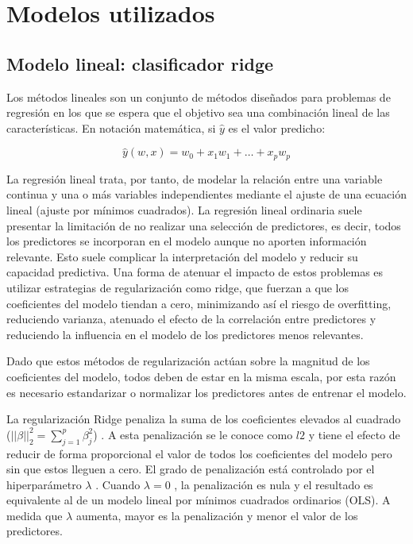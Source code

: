 
\section{Modelos utilizados}
\label{sec:models}

\subsection{Modelo lineal: clasificador ridge}

Los métodos lineales son un conjunto de métodos diseñados para problemas de regresión en los que se espera que el objetivo sea una combinación lineal de las características.
En notación matemática, si $\hat{y}$ es el valor predicho:

\begin{equation}
    \hat{y}(w,x)=w_{0} + x_{1}w_{1} + \dots + x_{p}w_{p}
\end{equation}

La regresión lineal trata, por tanto, de modelar la relación entre una variable continua y una o más variables independientes mediante el ajuste de una ecuación lineal (ajuste por mínimos cuadrados). 
La regresión lineal ordinaria suele presentar la limitación de no realizar una selección de predictores, es decir, todos los predictores se incorporan en el modelo aunque no aporten información relevante. Esto suele complicar la interpretación del modelo y reducir su capacidad predictiva.
Una forma de atenuar el impacto de estos problemas es utilizar estrategias de regularización como ridge, que fuerzan a que los coeficientes del modelo tiendan a cero, minimizando así el riesgo de overfitting, reduciendo varianza, atenuado el efecto de la correlación entre predictores y reduciendo la influencia en el modelo de los predictores menos relevantes.

Dado que estos métodos de regularización actúan sobre la magnitud de los coeficientes del modelo, todos deben de estar en la misma escala, por esta razón es necesario estandarizar o normalizar los predictores antes de entrenar el modelo.

La regularización Ridge penaliza la suma de los coeficientes elevados al cuadrado  ($||\beta||_{2}^{2}=\sum^{p}_{j=1}\beta^{2}_{j}$) . 
A esta penalización se le conoce como $l2$ y tiene el efecto de reducir de forma proporcional el valor de todos los coeficientes del modelo pero sin que estos lleguen a cero. El grado de penalización está controlado por el hiperparámetro  $\lambda$ . Cuando  $\lambda=0$ , la penalización es nula y el resultado es equivalente al de un modelo lineal por mínimos cuadrados ordinarios (OLS). A medida que  $\lambda$  aumenta, mayor es la penalización y menor el valor de los predictores.

